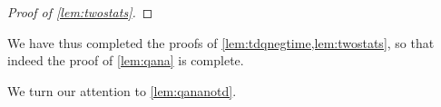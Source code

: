 \documentclass[
	fontsize=11pt, 
	twoside=false, 
	abstract=true, 
	a4paper,
]{scrartcl}
\newcommand{\dd}{\mathrm{d}}
\newcommand{\abs}[1]{\left\lvert#1\right\rvert}
\newcommand{\td}[1]{\tilde{#1}}
\begin{document}
\begin{proof}[Proof of \cref{lem:twostats}]
%
\end{proof}

We have thus completed the proofs of \cref{lem:tdqnegtime,lem:twostats}, so that indeed the proof of \cref{lem:qana} is complete. 

We turn our attention to \cref{lem:qananotd}.
\end{document}
